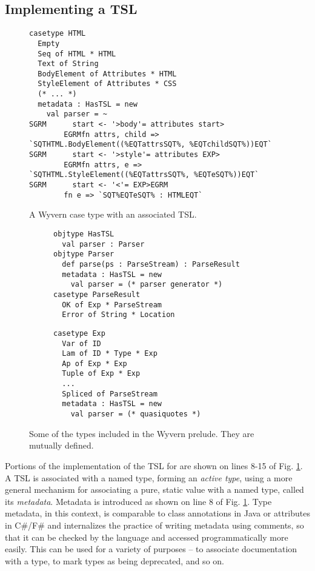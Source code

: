\subsection{Implementing a TSL}
\begin{figure}
\begin{lstlisting}[escapechar=$]
casetype HTML 
  Empty
  Seq of HTML * HTML 
  Text of String
  BodyElement of Attributes * HTML
  StyleElement of Attributes * CSS
  (* ... *)
  metadata : HasTSL = new
    val parser = ~
SGRM      start <- '>body'= attributes start>
        EGRMfn attrs, child => `SQTHTML.BodyElement((%EQTattrsSQT%, %EQTchildSQT%))EQT`
SGRM      start <- '>style'= attributes EXP>
        EGRMfn attrs, e => `SQTHTML.StyleElement((%EQTattrsSQT%, %EQTeSQT%))EQT`
SGRM      start <- '<'= EXP>EGRM 
        fn e => `SQT%EQTeSQT% : HTMLEQT`
\end{lstlisting}
\vspace{-8px}
\caption{A Wyvern case type with an associated TSL.}
\label{f-htmltype}
\end{figure}
\begin{figure}[t]
\begin{subfigure}[t]{.58\textwidth}
\begin{lstlisting}
objtype HasTSL
  val parser : Parser
objtype Parser                          
  def parse(ps : ParseStream) : ParseResult
  metadata : HasTSL = new
    val parser = (* parser generator *)
casetype ParseResult
  OK of Exp * ParseStream
  Error of String * Location  
\end{lstlisting}
\end{subfigure}
\begin{subfigure}[t]{.42\textwidth}
\begin{lstlisting}[linewidth=.42\textwidth,firstnumber=10]
casetype Exp 
  Var of ID
  Lam of ID * Type * Exp
  Ap of Exp * Exp
  Tuple of Exp * Exp
  ... 
  Spliced of ParseStream
  metadata : HasTSL = new
    val parser = (* quasiquotes *)
\end{lstlisting}
\end{subfigure}
\caption{Some of the types included in the Wyvern prelude. They are mutually defined.}
\label{f-builtins}
\end{figure}
Portions of the implementation of the TSL for  are shown on lines 8-15 of Fig. \ref{f-htmltype}. A TSL is associated with a named type, forming an \emph{active type}, using a more general mechanism for associating a pure, static value with a named type, called its \emph{metadata}. Metadata is introduced as shown on line 8 of Fig. \ref{f-htmltype}. Type metadata, in this context, is comparable to class annotations in Java or attributes in C\#/F\# and internalizes the practice of writing metadata using comments, so that it can be checked by the language and accessed programmatically more easily. This can be used for a variety of purposes -- to associate documentation with a type, to mark types as being deprecated, and so on.

